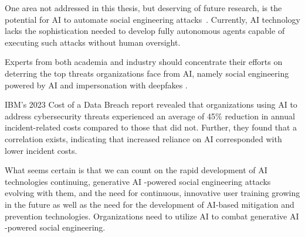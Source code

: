 


One area not addressed in this thesis, but deserving of future research, is the potential for AI to automate social engineering attacks~\citep{mirsky_Threat_Offensive_AI_Organizations_2023}. Currently, AI technology lacks the sophistication needed to develop fully autonomous agents capable of executing such attacks without human oversight.


Experts from both academia and industry should concentrate their efforts on deterring the top threats organizations face from AI, namely social engineering powered by AI and impersonation with deepfakes \citep{mirsky_Threat_Offensive_AI_Organizations_2023}.

IBM's 2023 Cost of a Data Breach report revealed that organizations using AI to address cybersecurity threats experienced an average of 45\% reduction in annual incident-related costs compared to those that did not. Further, they found that a correlation exists, indicating that increased reliance on AI corresponded with lower incident costs.

What seems certain is that we can count on the rapid development of AI technologies continuing, generative AI -powered social engineering attacks evolving with them, and the need for continuous, innovative user training growing in the future as well as the need for the development of AI-based mitigation and prevention technologies. Organizations need to utilize AI to combat generative AI -powered social engineering.



